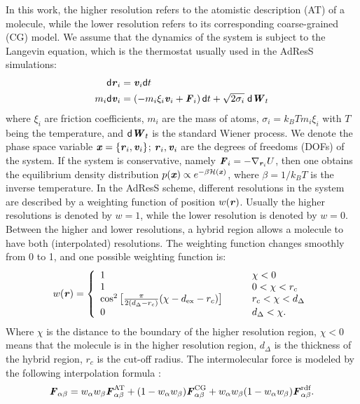 \documentclass[aip,jcp,a4paper,reprint,onecolumn]{revtex4-1}
\newcommand{\vect}[1]{\textbf{\textit{#1}}}
\newcommand{\dd}[1]{\textsf{#1}}
\newcommand{\AT}{{\textrm{{AT}}}}
\newcommand{\CG}{{\textrm{CG}}}
\newcommand{\HY}{{\Delta}}
\newcommand{\rdf}{{\textrm{rdf}}}
\begin{document}
In this work, the higher resolution refers to the atomistic
description (AT) of a molecule, while the lower resolution refers to
its corresponding coarse-grained (CG) model.  We assume that the dynamics of the
system is subject to the Langevin equation, which is the thermostat
usually used in the AdResS simulations:
\begin{align}
  \dd d\vect r_i &= \vect v_i\dd dt\\
  m_i\dd d\vect v_i &= (-m_i\xi_i\vect v_i + \vect F_i)\,\dd dt + \sqrt{2\sigma_i}\;\dd d\vect W_t
\end{align}
where $\xi_i$ are friction coefficients,
$m_i$ are the mass of atoms, $\sigma_i = k_BTm_i\xi_i$ with $T$ being
the temperature, and
$\dd d\vect W_t$ is the standard Wiener process. We denote the
phase space variable $\vect x = \{\vect r_i, \vect v_i\}$; $\vect r_i,
\vect v_i$ are the degrees of freedoms (DOFs) of the system.  If the
system is conservative, namely $\vect F_i = -\nabla_{\vect r_i}U$,
then one obtains the equilibrium density distribution $p(\vect
x)\propto e^{-\beta\mathcal H(\vect x)}$, where $\beta = 1/k_BT$ is the inverse temperature. In the AdResS scheme,
different resolutions in the system are described by a weighting
function of position $w(\vect r)$. Usually the higher resolutions is
denoted by $w = 1$, while the lower resolution is denoted by $w = 0$.
Between the higher and lower resolutions, a hybrid region allows a 
molecule to have both (interpolated) resolutions. The weighting function changes smoothly
from 0 to 1, and one possible weighting function is:
\begin{align}\label{eqn:new-w}
  w(\vect r) =
  \left\{
    \begin{array}{lcl}
      1 &\quad& \chi < 0\\
      1  && 0 < \chi < r_c\\
      \cos^2\big[\frac{\pi}{2(d_{\HY} - r_c)} (\chi - d_{\textrm{ex}} - r_c)\big] && r_c < \chi < d_{\HY} \\
      0 &&  d_{\HY}  < \chi.
    \end{array}
  \right.
\end{align}
Where $\chi$ is the distance to the boundary of the higher resolution
region, $\chi < 0$ means that the molecule is in the higher resolution
region, $d_{\HY}$ is the thickness of the hybrid region, $r_c$ is the
cut-off radius.  The intermolecular force is modeled by the following
interpolation formula \cite{rdfcorr}:
\begin{align}
  \vect F_{\alpha\beta} =
  w_\alpha w_\beta\vect F^{\AT}_{\alpha\beta} +
  (1-w_\alpha w_\beta)\vect F^{\CG}_{\alpha\beta} +
  w_\alpha w_\beta (1-w_\alpha w_\beta)\vect F_{\alpha\beta}^{\rdf}.
\label{grf}
\end{align}
\end{document}
